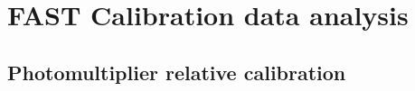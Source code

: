 
\chapter{FAST Calibration data analysis}

\section{Photomultiplier relative calibration}


\section{}


\section{}



